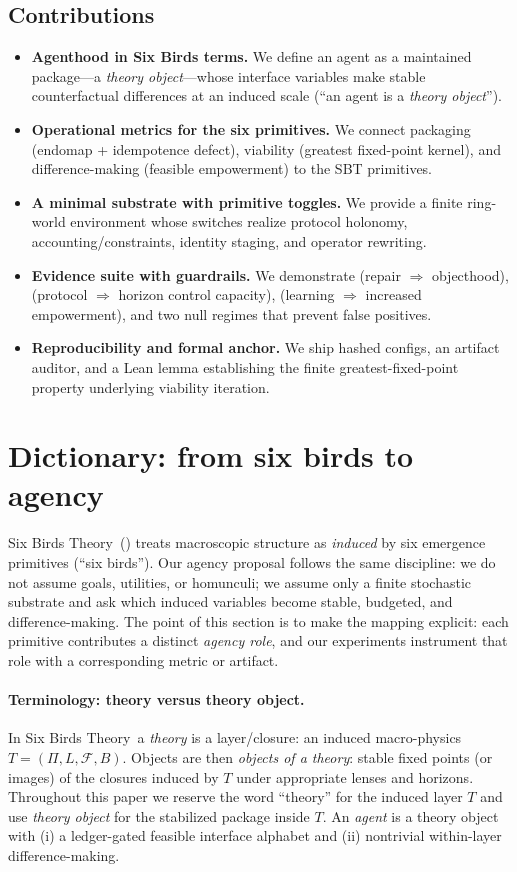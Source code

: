 \documentclass[11pt]{article}
\newcommand{\SBT}{Six Birds Theory}
\begin{document}
\subsection*{Contributions}
\begin{itemize}[leftmargin=*, itemsep=0.25em]
  \item \textbf{Agenthood in Six Birds terms.} We define an agent as a maintained package---a \emph{theory object}---whose interface variables make stable counterfactual differences at an induced scale (``an agent is a \emph{theory object}'').
  \item \textbf{Operational metrics for the six primitives.} We connect packaging (endomap + idempotence defect), viability (greatest fixed-point kernel), and difference-making (feasible empowerment) to the SBT primitives.
  \item \textbf{A minimal substrate with primitive toggles.} We provide a finite ring-world environment whose switches realize protocol holonomy, accounting/constraints, identity staging, and operator rewriting.
  \item \textbf{Evidence suite with guardrails.} We demonstrate (repair $\Rightarrow$ objecthood), (protocol $\Rightarrow$ horizon control capacity), (learning $\Rightarrow$ increased empowerment), and two null regimes that prevent false positives.
  \item \textbf{Reproducibility and formal anchor.} We ship hashed configs, an artifact auditor, and a Lean lemma establishing the finite greatest-fixed-point property underlying viability iteration.
\end{itemize}
 \section{Dictionary: from six birds to agency}
\label{sec:dictionary}

\SBT\ (\citep{six_birds_theory}) treats macroscopic structure as \emph{induced} by six emergence primitives (``six birds''). Our agency proposal follows the same discipline: we do not assume goals, utilities, or homunculi; we assume only a finite stochastic substrate and ask which induced variables become stable, budgeted, and difference-making. The point of this section is to make the mapping explicit: each primitive contributes a distinct \emph{agency role}, and our experiments instrument that role with a corresponding metric or artifact.

\paragraph{Terminology: theory versus theory object.}
In \SBT\ a \emph{theory} is a layer/closure: an induced macro-physics $T=(\Pi,L,\mathcal F,B)$. Objects are then \emph{objects of a theory}: stable fixed points (or images) of the closures induced by $T$ under appropriate lenses and horizons. Throughout this paper we reserve the word ``theory'' for the induced layer $T$ and use \emph{theory object} for the stabilized package inside $T$. An \emph{agent} is a theory object with (i) a ledger-gated feasible interface alphabet and (ii) nontrivial within-layer difference-making.
\end{document}
